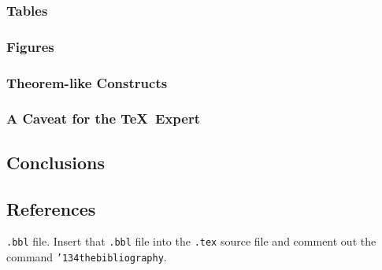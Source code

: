 \documentclass[sigconf]{acmart}
\begin{document}
\subsubsection{Tables}
\subsubsection{Figures}
\subsubsection{Theorem-like Constructs}
\subsubsection*{A Caveat for the \TeX\ Expert}
\subsection{Conclusions}
\subsection{References}

\texttt{.bbl} file.  Insert that \texttt{.bbl} file into the
\texttt{.tex} source file and comment out the command
\texttt{{\char'134}thebibliography}.




 
\end{document}
